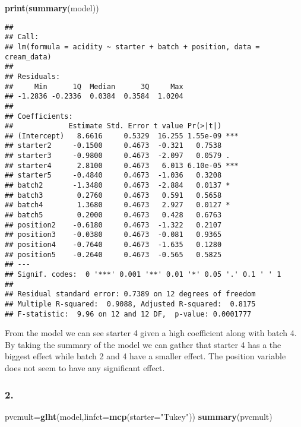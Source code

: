 \documentclass[11pt,]{article}
\newenvironment{Shaded}{\begin{snugshade}}{\end{snugshade}}
\newcommand{\KeywordTok}[1]{\textcolor[rgb]{0.13,0.29,0.53}{\textbf{{#1}}}}
\newcommand{\DataTypeTok}[1]{\textcolor[rgb]{0.13,0.29,0.53}{{#1}}}
\newcommand{\StringTok}[1]{\textcolor[rgb]{0.31,0.60,0.02}{{#1}}}
\newcommand{\NormalTok}[1]{{#1}}
\begin{document}
\begin{Shaded}
\begin{Highlighting}[]
\KeywordTok{print}\NormalTok{(}\KeywordTok{summary}\NormalTok{(model))}
\end{Highlighting}
\end{Shaded}

\begin{verbatim}
## 
## Call:
## lm(formula = acidity ~ starter + batch + position, data = cream_data)
## 
## Residuals:
##     Min      1Q  Median      3Q     Max 
## -1.2836 -0.2336  0.0384  0.3584  1.0204 
## 
## Coefficients:
##             Estimate Std. Error t value Pr(>|t|)    
## (Intercept)   8.6616     0.5329  16.255 1.55e-09 ***
## starter2     -0.1500     0.4673  -0.321   0.7538    
## starter3     -0.9800     0.4673  -2.097   0.0579 .  
## starter4      2.8100     0.4673   6.013 6.10e-05 ***
## starter5     -0.4840     0.4673  -1.036   0.3208    
## batch2       -1.3480     0.4673  -2.884   0.0137 *  
## batch3        0.2760     0.4673   0.591   0.5658    
## batch4        1.3680     0.4673   2.927   0.0127 *  
## batch5        0.2000     0.4673   0.428   0.6763    
## position2    -0.6180     0.4673  -1.322   0.2107    
## position3    -0.0380     0.4673  -0.081   0.9365    
## position4    -0.7640     0.4673  -1.635   0.1280    
## position5    -0.2640     0.4673  -0.565   0.5825    
## ---
## Signif. codes:  0 '***' 0.001 '**' 0.01 '*' 0.05 '.' 0.1 ' ' 1
## 
## Residual standard error: 0.7389 on 12 degrees of freedom
## Multiple R-squared:  0.9088, Adjusted R-squared:  0.8175 
## F-statistic:  9.96 on 12 and 12 DF,  p-value: 0.0001777
\end{verbatim}

From the model we can see starter 4 given a high coefficient along with
batch 4. By taking the summary of the model we can gather that starter 4
has a the biggest effect while batch 2 and 4 have a smaller effect. The
position variable does not seem to have any significant effect.

\subsubsection{2.}\label{section-13}

\begin{Shaded}
\begin{Highlighting}[]
\NormalTok{pvcmult=}\KeywordTok{glht}\NormalTok{(model,}\DataTypeTok{linfct=}\KeywordTok{mcp}\NormalTok{(}\DataTypeTok{starter=}\StringTok{"Tukey"}\NormalTok{))}
\KeywordTok{summary}\NormalTok{(pvcmult)}
\end{Highlighting}
\end{Shaded}
\end{document}
